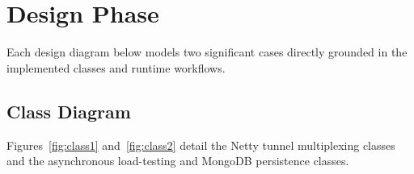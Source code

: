 \documentclass[11pt,a4paper]{report}
\begin{document}
\chapter{Design Phase}

Each design diagram below models two significant cases directly grounded in the implemented classes and runtime workflows.

\section{Class Diagram}

Figures~\ref{fig:class1} and~\ref{fig:class2} detail the Netty tunnel multiplexing classes and the asynchronous load-testing and MongoDB persistence classes.
\end{document}
